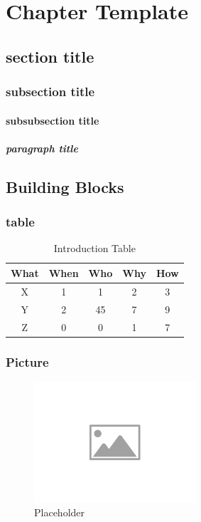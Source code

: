 \chapter{Chapter Template}
\label{ch:introduction}
\lipsum[1]

\section{section title}
\label{sec:introtitle}
\lipsum[1]
\subsection{subsection title}
\label{subsec:introtitle}
\lipsum[1]
\subsubsection{subsubsection title}
\label{subsubsec:introtitle}
\lipsum[1]
\paragraph{paragraph title}
\label{par:introtitle}
\lipsum[1]
\section{Building Blocks}
\subsection{table}
\begin{table}[!h]
	\begin{center}
		\begin{tabular}{@{}ccccc@{}}
			\toprule
			What & When & Who & Why & How \\ \midrule
			X    & 1    & 1   & 2   & 3   \\
			Y    & 2    & 45  & 7   & 9   \\
			Z    & 0    & 0   & 1   & 7   \\ \bottomrule
		\end{tabular}
		\caption{Introduction Table}
		\label{tab:introduction}
	\end{center}
\end{table}
\subsection{Picture}
\begin{figure}[!h]
	\centering
	\includegraphics[width=6cm]{images/placeholder-image}
	\caption[Placeholder]{Placeholder}
	\label{fig:placeholder-image}
\end{figure}
